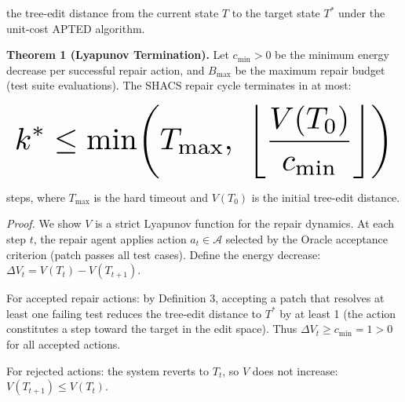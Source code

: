 \documentclass{article}
\begin{document}
the tree-edit distance from the current state $T$ to the target state $T^*$ under the unit-cost APTED algorithm.

\textbf{Theorem 1 (Lyapunov Termination).} Let $c_{\min} > 0$ be the minimum energy decrease per successful repair action, and $B_{\max}$ be the maximum repair budget (test suite evaluations). The SHACS repair cycle terminates in at most:





















\begin{equation}
\resizebox{\columnwidth}{!}{$\displaystyle
\begin{aligned}
k^* \leq \min\!\left(T_{\max},\ \left\lfloor \frac{V(T_0)}{c_{\min}} \right\rfloor\right)
\end{aligned}
$}
\end{equation}





















steps, where $T_{\max}$ is the hard timeout and $V(T_0)$ is the initial tree-edit distance.

\textit{Proof.} We show $V$ is a strict Lyapunov function for the repair dynamics. At each step $t$, the repair agent applies action $a_t \in \mathcal{A}$ selected by the Oracle acceptance criterion (patch passes all test cases). Define the energy decrease: $\Delta V_t = V(T_t) - V(T_{t+1})$.

For accepted repair actions: by Definition 3, accepting a patch that resolves at least one failing test reduces the tree-edit distance to $T^*$ by at least 1 (the action constitutes a step toward the target in the edit space). Thus $\Delta V_t \geq c_{\min} = 1 > 0$ for all accepted actions.

For rejected actions: the system reverts to $T_t$, so $V$ does not increase: $V(T_{t+1}) \leq V(T_t)$.
\end{document}
